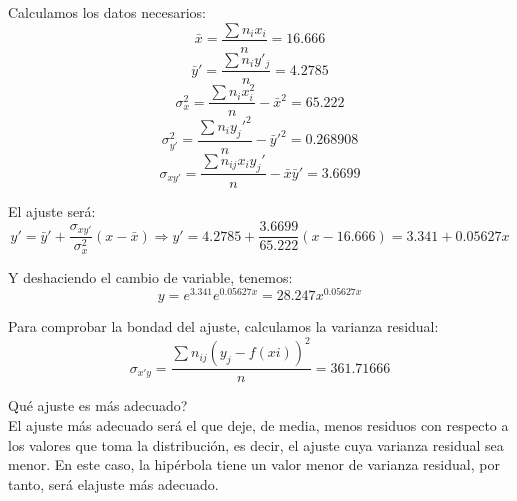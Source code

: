 \documentclass[a4paper,12pt]{article}
\begin{document}
\begin{enumerate}
\begin{center}
\begin{tabular}{c|cccccc}
    \end{tabular}
    \end{center}
    
    Calculamos los datos necesarios:
    $$\bar x= \frac {\sum n_ix_i}{n}=16.666$$
    $$\bar y'= \frac {\sum n_iy'_j}{n}=4.2785$$
    $$\sigma_{x}^2=\frac {\sum n_ix_i^2}{n}-\bar x^2 = 65.222$$
    $$\sigma_{y'}^2=\frac {\sum n_iy_j'^2}{n}-\bar y'^2 = 0.268908$$
    $$\sigma_{xy'}=\frac {\sum n_{ij}x_iy_j'}{n}-\bar x \bar y' = 3.6699$$

    El ajuste será:
    $$y'= \bar y' + \frac {\sigma_{xy'}}{\sigma_{x}^2}(x-\bar x) \Rightarrow y'=4.2785 + \frac {3.6699}{65.222}(x-16.666) = 3.341+ 0.05627x$$
    
    Y deshaciendo el cambio de variable, tenemos:
    $$y=e^{3.341}e^{0.05627x}= 28.247x^{0.05627x}$$
    
    Para comprobar la bondad del ajuste, calculamos la varianza residual:
    $$\sigma_{x'y}=\frac {\sum n_{ij}(y_j-f(xi))^2}{n}= 361.71666$$
    
\end{enumerate}
\textquestiondown Qué ajuste es más adecuado?\\
El ajuste más adecuado será el que deje, de media, menos residuos con respecto a los valores que toma la distribución, es decir, el ajuste cuya varianza residual sea menor. En este caso, la hipérbola tiene un valor menor de varianza residual, por tanto, será elajuste más adecuado.
\end{document}
